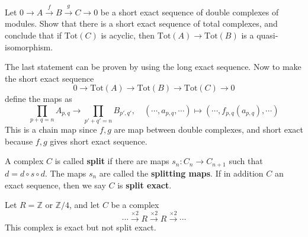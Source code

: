 \begin{exer} Let $0\rightarrow A\xrightarrow{f} B\xrightarrow{g} C\rightarrow 0$ be a short exact sequence of double complexes of modules. Show that there is a short exact sequence of total complexes, and conclude that if $\textrm{Tot}(C)$ is acyclic, then $\textrm{Tot}(A)\rightarrow \textrm{Tot}(B)$ is a quasi-isomorphism.
\end{exer}
\begin{solution} The last statement can be proven by using the long exact sequence. Now to make the short exact sequence
\begin{equation}
0\rightarrow \textrm{Tot}(A)\rightarrow \textrm{Tot}(B)\rightarrow \textrm{Tot}(C)\rightarrow 0
\end{equation}
define the maps as
\begin{equation}
\prod_{p+q=n}A_{p,q}\rightarrow \prod_{p'+q'=n}B_{p',q'},\quad (\cdots,a_{p,q},\cdots)\mapsto (\cdots,f_{p,q}(a_{p,q}),\cdots)
\end{equation}
This is a chain map since $f,g$ are map between double complexes, and short exact because $f,g$ gives short exact sequence.
\end{solution}

\begin{defn} A complex $C$ is called \textbf{split} if there are maps $s_n:C_n\rightarrow C_{n+1}$ such that $d=d\circ s\circ d$. The maps $s_n$ are called the \textbf{splitting maps}. If in addition $C$ an exact sequence, then we say $C$ is \textbf{split exact}.
\end{defn}

\begin{exmp} Let $R=\mathbb{Z}$ or $\mathbb{Z}/4$, and let $C$ be a complex
\begin{equation}
\cdots\xrightarrow{\times 2}R\xrightarrow{\times 2}R\xrightarrow{\times 2}\cdots
\end{equation}
This complex is exact but not split exact.
\end{exmp}

